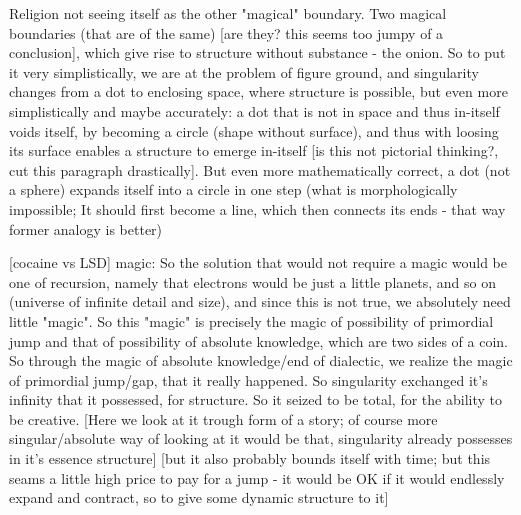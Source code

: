 \documentclass[10pt]{book}
\begin{document}
Religion not seeing itself as the other "magical" boundary. 
Two magical boundaries (that are of the same) [are they? this seems too jumpy of a conclusion], which give rise to structure without substance - the onion.
So to put it very simplistically, we are at the problem of figure ground, and singularity changes from a dot to enclosing space, where structure is possible, but even more simplistically and maybe accurately: a dot that is not in space and thus in-itself voids itself, by becoming a circle (shape without surface), and thus with loosing its surface enables a structure to emerge in-itself [is this not pictorial thinking?, cut this paragraph drastically]. But even more mathematically correct, a dot (not a sphere) expands itself into a circle in one step (what is morphologically impossible; It should first become a line, which then connects its ends - that way former analogy is better)

[cocaine vs LSD]
magic:
So the solution that would not require a magic would be one of recursion, namely that electrons would be just a little planets, and so on (universe of infinite detail and size), and since this is not true, we absolutely need little "magic". So this "magic" is precisely the magic of possibility of primordial jump and that of possibility of absolute knowledge, which are two sides of a coin. So through the magic of absolute knowledge/end of dialectic, we realize the magic of primordial jump/gap, that it really happened. So singularity exchanged it's infinity that it possessed, for structure. So it seized to be total, for the ability to be creative. [Here we look at it trough form of a story; of course more singular/absolute way of looking at it would be that, singularity already possesses in it's essence structure] [but it also probably bounds itself with time; but this seams a little high price to pay for a jump - it would be OK if it would endlessly expand and contract, so to give some dynamic structure to it]
\end{document}
